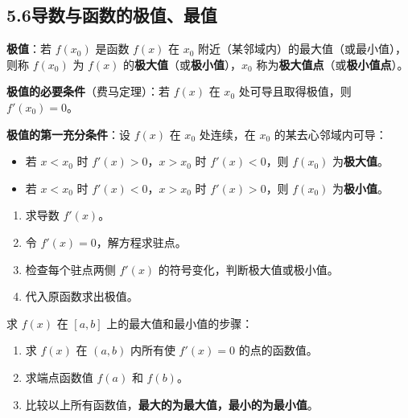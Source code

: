 \documentclass[12pt, a4paper]{ctexart}
\begin{document}
\subsection*{5.6\quad 导数与函数的极值、最值}

\begin{knowledgebox}[极值的定义与判定]
\textbf{极值}：若 $f(x_0)$ 是函数 $f(x)$ 在 $x_0$ 附近（某邻域内）的最大值（或最小值），则称 $f(x_0)$ 为 $f(x)$ 的\textbf{极大值}（或\textbf{极小值}），$x_0$ 称为\textbf{极大值点}（或\textbf{极小值点}）。

\textbf{极值的必要条件}（费马定理）：若 $f(x)$ 在 $x_0$ 处可导且取得极值，则 $f'(x_0) = 0$。

\textbf{极值的第一充分条件}：设 $f(x)$ 在 $x_0$ 处连续，在 $x_0$ 的某去心邻域内可导：
\begin{itemize}[leftmargin=2em]
  \item 若 $x < x_0$ 时 $f'(x) > 0$，$x > x_0$ 时 $f'(x) < 0$，则 $f(x_0)$ 为\textbf{极大值}。
  \item 若 $x < x_0$ 时 $f'(x) < 0$，$x > x_0$ 时 $f'(x) > 0$，则 $f(x_0)$ 为\textbf{极小值}。
\end{itemize}
\end{knowledgebox}

\begin{knowledgebox}[求函数极值的步骤]
\begin{enumerate}[leftmargin=2em]
  \item 求导数 $f'(x)$。
  \item 令 $f'(x) = 0$，解方程求驻点。
  \item 检查每个驻点两侧 $f'(x)$ 的符号变化，判断极大值或极小值。
  \item 代入原函数求出极值。
\end{enumerate}
\end{knowledgebox}

\begin{knowledgebox}[闭区间上函数的最值]
求 $f(x)$ 在 $[a, b]$ 上的最大值和最小值的步骤：
\begin{enumerate}[leftmargin=2em]
  \item 求 $f(x)$ 在 $(a, b)$ 内所有使 $f'(x) = 0$ 的点的函数值。
  \item 求端点函数值 $f(a)$ 和 $f(b)$。
  \item 比较以上所有函数值，\textbf{最大的为最大值，最小的为最小值}。
\end{enumerate}
\end{knowledgebox}
\end{document}
